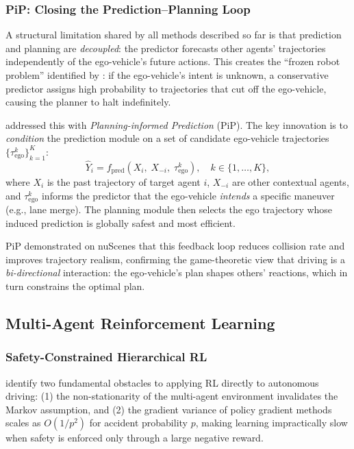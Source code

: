 \documentclass[12pt, a4paper]{article}
\begin{document}
\subsubsection{PiP: Closing the Prediction--Planning Loop}
\label{sec:pip}

A structural limitation shared by all methods described so far is that prediction
and planning are \emph{decoupled}: the predictor forecasts other agents'
trajectories independently of the ego-vehicle's future actions. This creates the
``frozen robot problem'' identified by \citet{song2020pip}: if the ego-vehicle's
intent is unknown, a conservative predictor assigns high probability to trajectories
that cut off the ego-vehicle, causing the planner to halt indefinitely.

\citet{song2020pip} addressed this with \emph{Planning-informed Prediction} (PiP).
The key innovation is to \emph{condition} the prediction module on a set of
candidate ego-vehicle trajectories $\{\tau^k_{\text{ego}}\}_{k=1}^K$:
\begin{equation}
  \hat{Y}_i = f_{\text{pred}}\!\left( X_i,\; X_{-i},\; \tau^k_{\text{ego}} \right),
  \quad k \in \{1, \dots, K\},
\end{equation}
where $X_i$ is the past trajectory of target agent $i$, $X_{-i}$ are other
contextual agents, and $\tau^k_{\text{ego}}$ informs the predictor that the
ego-vehicle \emph{intends} a specific maneuver (e.g., lane merge). The planning
module then selects the ego trajectory whose induced prediction is globally safest
and most efficient.

PiP demonstrated on nuScenes that this feedback loop reduces collision rate and
improves trajectory realism, confirming the game-theoretic view that driving is a
\emph{bi-directional} interaction: the ego-vehicle's plan shapes others' reactions,
which in turn constrains the optimal plan.

\subsection{Multi-Agent Reinforcement Learning}

\subsubsection{Safety-Constrained Hierarchical RL}
\label{sec:rss}

\citet{shalev2016safe} identify two fundamental obstacles to applying RL directly
to autonomous driving: (1) the non-stationarity of the multi-agent environment
invalidates the Markov assumption, and (2) the gradient variance of policy gradient
methods scales as $O(1/p^2)$ for accident probability $p$, making learning
impractically slow when safety is enforced only through a large negative reward.
\end{document}

